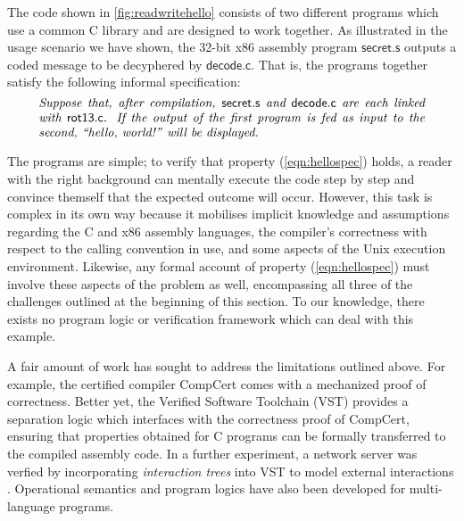 \documentclass[acmsmall,screen,review,anonymous,nonacm]{acmart}
\newcommand{\kw}[1]{\ensuremath{ \mathsf{#1} }}
\begin{document}
\begin{example} \label{ex:readwritehello} %
The code shown in \autoref{fig:readwritehello}
consists of two different programs which
use a common C library and
are designed to work together.
As illustrated in the usage scenario we have shown,
the 32-bit x86 assembly program \kw{secret.s} 
outputs a coded message
to be decyphered by \kw{decode.c}.
That is,
the programs together satisfy the following informal specification:
\begin{equation}
  \begin{minipage}{.9\textwidth}
  \it
  Suppose that,
  after compilation,
  \kw{secret.s} and \kw{decode.c}
  are each linked with \kw{rot13.c}.
  If the output of the first program
  is fed as input to the second,
  ``hello, world!'' will be displayed.
  \end{minipage}
  \label{eqn:hellospec}
\end{equation}

The programs are simple;
to verify that property (\ref{eqn:hellospec}) holds,
a reader with the right background
can mentally execute the code step by step
and convince themself that the expected outcome will occur.
However, this task is complex in its own way
because it mobilises implicit knowledge and assumptions regarding
the C and x86 assembly languages,
the compiler's correctness with respect to the calling convention in use,
and some aspects of the Unix execution environment.
%
Likewise, any formal account of property (\ref{eqn:hellospec})
must involve these aspects of the problem as well,
encompassing all three of the challenges outlined at the beginning of this section.
To our knowledge,
there exists no program logic or verification framework
which can deal with this example.
\end{example}

A fair amount of work has sought to address
the limitations outlined above.
For example,
the certified compiler CompCert \citep{compcert}
comes with a mechanized proof of correctness.
Better yet,
the Verified Software Toolchain (VST) \citep{vst}
provides a separation logic which interfaces with
the correctness proof of CompCert,
ensuring that properties obtained for C programs
can be formally transferred to the compiled assembly code.
In a further experiment,
a network server was verfied
by incorporating \emph{interaction trees} into VST
to model external interactions \cite{itrees}.
Operational semantics \cite{opsem-multi} and
program logics \cite{melocoton}
have also been developed for multi-language programs.
\end{document}
